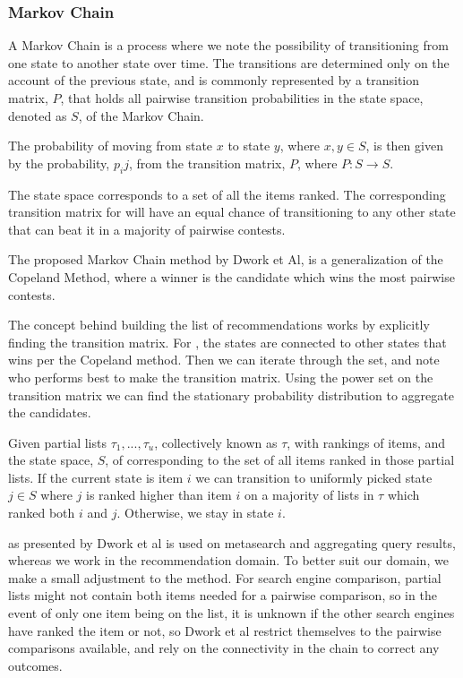 \subsubsection{Markov Chain}\label{sec:markovchain}
A Markov Chain is a process where we note the possibility of transitioning from one state to another state over time. The transitions are determined only on the account of the previous state, and is commonly represented by a transition matrix, $P$, that holds all pairwise transition probabilities in the state space, denoted as $S$, of the Markov Chain.

The probability of moving from state $x$ to state $y$, where $x, y \in S$, is then given by the probability, $p_ij$, from the transition matrix, $P$, where $P : S \rightarrow S$.


The \MC state space corresponds to a set of all the items ranked. The corresponding transition matrix for \MC will have an equal chance of transitioning to any other state that can beat it in a majority of pairwise contests.

The proposed Markov Chain method by Dwork et Al, \MC is a generalization of the Copeland Method\cite{saari1996}, where a winner is the candidate which wins the most pairwise contests\cite{rank:aggregation}.

The concept behind building the list of recommendations works by explicitly finding the transition matrix. For \MC, the states are connected to other states that wins per the Copeland method. Then we can iterate through the set, and note who performs best to make the transition matrix. Using the power set on the transition matrix we can find the stationary probability distribution to aggregate the candidates.

Given partial lists $\tau_1,...,\tau_u$, collectively known as $\tau$, with rankings of items, and the state space, $S$, of \MC corresponding to the set of all items ranked in those partial lists. If the current state is item $i$ we can transition to uniformly picked state $j \in S$ where $j$ is ranked higher than item $i$ on a majority of lists in $\tau$ which ranked both $i$ and $j$. Otherwise, we stay in state $i$.

\MC as presented by Dwork et al is used on metasearch and aggregating query results, whereas we work in the recommendation domain. To better suit our domain, we make a small adjustment to the method. For search engine comparison, partial lists might not contain both items needed for a pairwise comparison, so in the event of only one item being on the list, it is unknown if the other search engines have ranked the item or not, so Dwork et al restrict themselves to the pairwise comparisons available, and rely on the connectivity in the chain to correct any outcomes.

